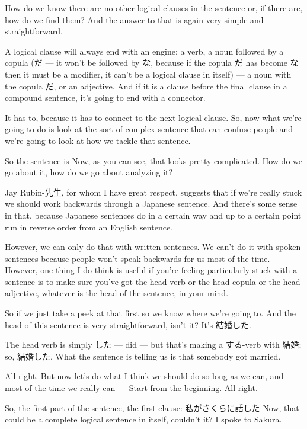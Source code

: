 {}

How do we know there are no other logical clauses in the sentence or, if there are, how do we find them? And the answer to that is again very simple and straightforward.

A logical clause will always end with an engine: a verb, a noun followed by a copula (だ --- it won't be followed by な, because if the copula だ has become な then it must be a modifier, it can't be a logical clause in itself) --- a noun with the copula だ, or an adjective. And if it is a clause before the final clause in a compound sentence, it's going to end with a connector.

It has to, because it has to connect to the next logical clause. So, now what we're going to do is look at the sort of complex sentence that can confuse people and we're going to look at how we tackle that sentence.

So the sentence is  Now, as you can see, that looks pretty complicated. How do we go about it, how do we go about analyzing it?

Jay Rubin-先生, for whom I have great respect, suggests that if we're really stuck we should work backwards through a Japanese sentence. And there's some sense in that, because Japanese sentences do in a certain way and up to a certain point run in reverse order from an English sentence.

However, we can only do that with written sentences. We can't do it with spoken sentences because people won't speak backwards for us most of the time. However, one thing I do think is useful if you're feeling particularly stuck with a sentence is to make sure you've got the head verb or the head copula or the head adjective, whatever is the head of the sentence, in your mind.

So if we just take a peek at that first so we know where we're going to. And the head of this sentence is very straightforward, isn't it? It's 結婚した.

The head verb is simply した --- did --- but that's making a する-verb with 結婚; so, 結婚した. What the sentence is telling us is that somebody got married.

All right. But now let's do what I think we should do so long as we can, and most of the time we really can --- Start from the beginning. All right.

So, the first part of the sentence, the first clause: 私がさくらに話した Now, that could be a complete logical sentence in itself, couldn't it? I spoke to Sakura.

